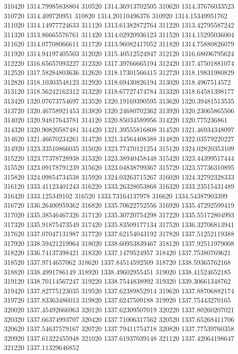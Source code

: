 {310420 1314.79985838804
310520 1314.36913702505
310620 1314.37676033523
310720 1314.409720951
310820 1314.20110496376
310920 1314.15349951762
311020 1314.14977724633
311120 1313.61382872764
311220 1313.42795587242
311320 1313.86665576761
311420 1314.02920936123
311520 1314.15295036004
311620 1314.07708066611
311720 1313.96082417052
311820 1314.75880826079
311920 1314.94197405503
312020 1315.40512524947
312120 1316.68696795624
312220 1316.65657093227
312320 1317.39766665194
312420 1317.47501881074
312520 1317.58284803636
312620 1318.17301566415
312720 1318.19831980829
312820 1318.10303548123
312920 1318.69430826194
313020 1318.4967514572
313120 1318.56242162312
313220 1318.67727474784
313320 1318.64581398177
313420 1320.07673754697
313520 1320.19169390595
313620 1320.39481513535
313720 1320.46758921453
313820 1320.24680702362
313920 1320.23065865506
314020 1320.94817643781
314120 1320.85034589956
314220 1320.775236861
314320 1320.90820587481
314420 1321.39555816808
314520 1321.46934348097
314620 1321.46670234261
314720 1321.34564408388
314820 1322.03579220227
314920 1323.33510866035
315020 1323.77470121254
315120 1324.02820353109
315220 1323.77378728938
315320 1323.38940458448
315420 1323.44399517444
315520 1323.09178791239
315620 1323.04838799367
315720 1323.57736310895
315820 1324.09854734538
315920 1324.03263715267
316020 1324.32792328333
316120 1333.41123401243
316220 1333.26328053868
316320 1333.23515431489
316420 1333.125349102
316520 1333.73164137978
316620 1334.54387903399
316720 1336.26400959362
316820 1335.70622752556
316920 1335.47292599419
317020 1335.38546467326
317120 1335.30720754298
317220 1335.55172804993
317320 1335.91875473549
317420 1335.83509177134
317520 1336.32706813941
317620 1337.07047131987
317720 1337.62154043192
317820 1337.51252119388
317920 1338.59421219964
318020 1338.60953839467
318120 1337.92511979008
318220 1336.74137398421
318320 1337.1479524957
318420 1337.75380769621
318520 1337.9714657062
318620 1337.84514592509
318720 1338.59365762168
318820 1338.4991786149
318920 1338.49602955451
319020 1338.41524652185
319120 1338.70114567247
319220 1338.7544838992
319320 1339.30661348762
319420 1337.82775123035
319520 1337.62389852914
319620 1337.88706882174
319720 1337.83363486013
319820 1337.6247509188
319920 1337.75443270165
320020 1337.45492666963
320120 1337.62309507019
320220 1337.80260207021
320320 1337.66374993707
320420 1337.71006317562
320520 1337.65268411706
320620 1337.54637579167
320720 1337.79411754718
320820 1337.77539760358
320920 1337.61322455948
321020 1337.61937039148
321120 1337.42064198647
321220 1337.11329646852
}

